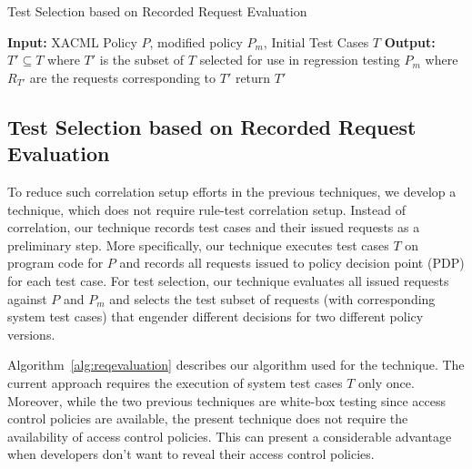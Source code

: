 \begin{algorithmic}
\begin{algorithm}[t]
\caption{\label{alg:reqevaluation}Test Selection based on Recorded Request Evaluation}
\STATE \textbf{Input:} XACML Policy $P$, modified policy $P_{m}$, Initial Test Cases $T$
\STATE \textbf{Output:} $T' \subseteq T$ where $T'$ is the subset of $T$ selected for use in regression testing $P_{m}$
 where $R_{T'}$ are the requests corresponding to $T'$ 
\ENDIF
\ENDFOR
{}
\STATE return $T'$
\end{algorithm}
\end{algorithmic}

\subsection{Test Selection based on Recorded Request Evaluation}
To reduce such correlation setup efforts in the previous techniques, we develop
a technique, which does not require rule-test correlation setup.
Instead of correlation, our technique records test cases and their issued requests as a preliminary step.
More specifically, our technique executes test cases $T$ on program code for $P$ and records all requests issued to policy decision point (PDP) for each test case. For test selection, our technique evaluates all issued requests against $P$ and $P_m$ and selects the test subset of
requests (with corresponding system test cases) that engender different decisions for two different policy versions.

Algorithm~\ref{alg:reqevaluation} describes our algorithm used for the technique.
The current approach requires the execution of system test cases $T$ only once.
Moreover, while the two previous techniques are white-box testing since access control policies are available, the present technique 
does not require the availability of access control policies. This can present a considerable advantage when developers don't want 
to reveal their access control policies.



